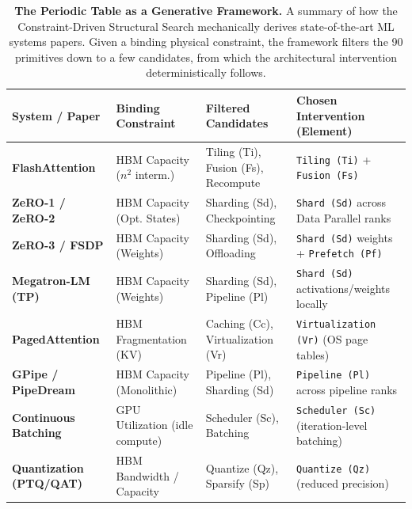 
\begin{table}[t!]
\centering
\caption{\textbf{The Periodic Table as a Generative Framework.} A summary of how the Constraint-Driven Structural Search mechanically derives state-of-the-art ML systems papers. Given a binding physical constraint, the framework filters the 90 primitives down to a few candidates, from which the architectural intervention deterministically follows.}
\label{tab:predict-the-paper}
\small
\begin{tabularx}{\textwidth}{@{} >{\bfseries}l l l X @{}}
\toprule
\textbf{System / Paper} & \textbf{Binding Constraint} & \textbf{Filtered Candidates} & \textbf{Chosen Intervention (Element)} \\
\midrule
FlashAttention & HBM Capacity ($n^2$ interm.) & Tiling (Ti), Fusion (Fs), Recompute & \texttt{Tiling (Ti)} + \texttt{Fusion (Fs)} \\
ZeRO-1 / ZeRO-2 & HBM Capacity (Opt. States) & Sharding (Sd), Checkpointing & \texttt{Shard (Sd)} across Data Parallel ranks \\
ZeRO-3 / FSDP & HBM Capacity (Weights) & Sharding (Sd), Offloading & \texttt{Shard (Sd)} weights + \texttt{Prefetch (Pf)} \\
Megatron-LM (TP) & HBM Capacity (Weights) & Sharding (Sd), Pipeline (Pl) & \texttt{Shard (Sd)} activations/weights locally \\
PagedAttention & HBM Fragmentation (KV) & Caching (Cc), Virtualization (Vr) & \texttt{Virtualization (Vr)} (OS page tables) \\
GPipe / PipeDream & HBM Capacity (Monolithic) & Pipeline (Pl), Sharding (Sd) & \texttt{Pipeline (Pl)} across pipeline ranks \\
Continuous Batching & GPU Utilization (idle compute) & Scheduler (Sc), Batching & \texttt{Scheduler (Sc)} (iteration-level batching) \\
Quantization (PTQ/QAT) & HBM Bandwidth / Capacity & Quantize (Qz), Sparsify (Sp) & \texttt{Quantize (Qz)} (reduced precision) \\
\bottomrule
\end{tabularx}
\end{table}
